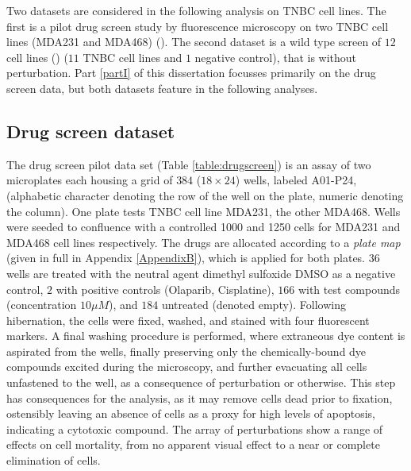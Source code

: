
Two datasets are considered in the following analysis on TNBC cell lines. The first is a pilot drug screen study by fluorescence microscopy on two TNBC cell lines (MDA231 and MDA468) (\cite{filmus1985mda}). The second dataset is a wild type screen of $12$ cell lines (\cite{chavez2010triple}) ($11$ TNBC cell lines and $1$ negative control), that is without perturbation. Part \ref{partI} of this dissertation focusses primarily on the drug screen data, but both datasets feature in the following analyses.

\subsection{Drug screen dataset}

The drug screen pilot data set (Table \ref{table:drugscreen}) is an assay of two microplates each housing a grid of $384$ ($18 \times 24$) wells, labeled A01-P24, (alphabetic character denoting the row of the well on the plate, numeric denoting the column). One plate tests TNBC cell line MDA231, the other MDA468. Wells were seeded to confluence with a controlled 1000 and 1250 cells for MDA231 and MDA468 cell lines respectively. The drugs are allocated according to a \emph{plate map} (given in full in Appendix \ref{AppendixB}), which is applied for both plates. $36$ wells are treated with the neutral agent dimethyl sulfoxide DMSO as a negative control, $2$ with positive controls (Olaparib, Cisplatine), $166$ with test compounds (concentration $10\mu M$), and $184$ untreated (denoted empty). Following hibernation, the cells were fixed, washed, and stained with four fluorescent markers. A final washing procedure is performed, where extraneous dye content is aspirated from the wells, finally preserving only the chemically-bound dye compounds excited during the microscopy, and further evacuating all cells unfastened to the well, as a consequence of perturbation or otherwise. This step has consequences for the analysis, as it may remove cells dead prior to fixation, ostensibly leaving an absence of cells as a proxy for high levels of apoptosis, indicating a cytotoxic compound. The array of perturbations show a range of effects on cell mortality, from no apparent visual effect to a near or complete elimination of cells.

